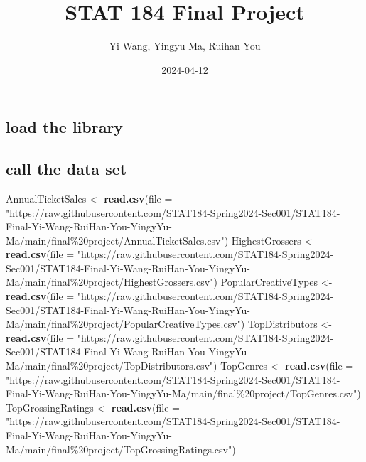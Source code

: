 \documentclass[
]{article}
\title{STAT 184 Final Project}
\author{Yi Wang, Yingyu Ma, Ruihan You}
\date{2024-04-12}
\newenvironment{Shaded}{\begin{snugshade}}{\end{snugshade}}
\newcommand{\AttributeTok}[1]{\textcolor[rgb]{0.13,0.29,0.53}{#1}}
\newcommand{\FunctionTok}[1]{\textcolor[rgb]{0.13,0.29,0.53}{\textbf{#1}}}
\newcommand{\NormalTok}[1]{#1}
\newcommand{\OtherTok}[1]{\textcolor[rgb]{0.56,0.35,0.01}{#1}}
\newcommand{\StringTok}[1]{\textcolor[rgb]{0.31,0.60,0.02}{#1}}
\begin{document}
\maketitle

\hypertarget{load-the-library}{%
\subsection{load the library}\label{load-the-library}}

\hypertarget{call-the-data-set}{%
\subsection{call the data set}\label{call-the-data-set}}

\begin{Shaded}
\begin{Highlighting}[]
\NormalTok{AnnualTicketSales }\OtherTok{\textless{}{-}} \FunctionTok{read.csv}\NormalTok{(}\AttributeTok{file =} \StringTok{"https://raw.githubusercontent.com/STAT184{-}Spring2024{-}Sec001/STAT184{-}Final{-}Yi{-}Wang{-}RuiHan{-}You{-}YingyYu{-}Ma/main/final\%20project/AnnualTicketSales.csv"}\NormalTok{)}
\NormalTok{HighestGrossers }\OtherTok{\textless{}{-}} \FunctionTok{read.csv}\NormalTok{(}\AttributeTok{file =} \StringTok{"https://raw.githubusercontent.com/STAT184{-}Spring2024{-}Sec001/STAT184{-}Final{-}Yi{-}Wang{-}RuiHan{-}You{-}YingyYu{-}Ma/main/final\%20project/HighestGrossers.csv"}\NormalTok{)}
\NormalTok{PopularCreativeTypes }\OtherTok{\textless{}{-}} \FunctionTok{read.csv}\NormalTok{(}\AttributeTok{file =} \StringTok{"https://raw.githubusercontent.com/STAT184{-}Spring2024{-}Sec001/STAT184{-}Final{-}Yi{-}Wang{-}RuiHan{-}You{-}YingyYu{-}Ma/main/final\%20project/PopularCreativeTypes.csv"}\NormalTok{)}
\NormalTok{TopDistributors }\OtherTok{\textless{}{-}} \FunctionTok{read.csv}\NormalTok{(}\AttributeTok{file =} \StringTok{"https://raw.githubusercontent.com/STAT184{-}Spring2024{-}Sec001/STAT184{-}Final{-}Yi{-}Wang{-}RuiHan{-}You{-}YingyYu{-}Ma/main/final\%20project/TopDistributors.csv"}\NormalTok{)}
\NormalTok{TopGenres }\OtherTok{\textless{}{-}} \FunctionTok{read.csv}\NormalTok{(}\AttributeTok{file =} \StringTok{"https://raw.githubusercontent.com/STAT184{-}Spring2024{-}Sec001/STAT184{-}Final{-}Yi{-}Wang{-}RuiHan{-}You{-}YingyYu{-}Ma/main/final\%20project/TopGenres.csv"}\NormalTok{)}
\NormalTok{TopGrossingRatings }\OtherTok{\textless{}{-}} \FunctionTok{read.csv}\NormalTok{(}\AttributeTok{file =} \StringTok{"https://raw.githubusercontent.com/STAT184{-}Spring2024{-}Sec001/STAT184{-}Final{-}Yi{-}Wang{-}RuiHan{-}You{-}YingyYu{-}Ma/main/final\%20project/TopGrossingRatings.csv"}\NormalTok{)}

\end{Highlighting}
\end{Shaded}
\end{document}
